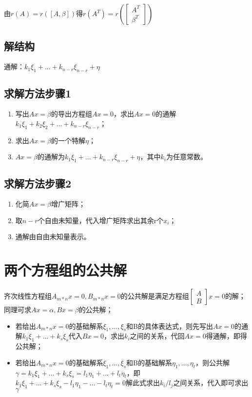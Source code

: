 由\(r(A) = r([A, \beta])\)得\(r(A^T) = r(\begin{bmatrix}
    A^T \\ 
    \beta^T
\end{bmatrix})\)

\subsection{解结构}
通解：\(k_1\xi_1 + ... + k_{n - r}\xi_{n - r} + \eta\)


\subsection{求解方法步骤1}
\begin{enumerate}
    \item 写出\(Ax = \beta\)的导出方程组\(Ax = 0\)，求出\(Ax = 0\)的通解\(k_1\xi_1 + k_2\xi_2 + ... + k_{n - r}\xi_{n - r}\)；
    \item 求出\(Ax = \beta\)的一个特解\(\eta\)；
    \item \(Ax = \beta\)的通解为\(k_1\xi_1 + ... + k_{n - r}\xi_{n - r} + \eta\)，其中\(k_i\)为任意常数。
\end{enumerate}


\subsection{求解方法步骤2}
\begin{enumerate}
    \item 化简\(Ax = \beta\)增广矩阵；
    \item 取\(n - r\)个自由未知量，代入增广矩阵求出其余r个\(x_i\)；
    \item 通解由自由未知量表示。
\end{enumerate}


\section{两个方程组的公共解}

齐次线性方程组\(A_{m * n}x = 0, B_{m * n}x = 0\)的公共解是满足方程组\(\begin{bmatrix}
A \\ 
B
\end{bmatrix}x = 0\)的解；同理可求\(Ax = \alpha, Bx = \beta\)的公共解；
\begin{itemize}
    \item 若给出\(A_{m * n}x = 0\)的基础解系\(\xi_1, ..., \xi_s\)和B的具体表达式，则先写出\(Ax = 0\)的通解\(k_1\xi_1 + ... + k_s\xi_s\)代入\(Bx = 0\)，求出\(k_i\)之间的关系，代回\(Ax = 0\)得通解，即得公共解；
    \item 若给出\(A_{m * n}x = 0\)的基础解系\(\xi_1, ..., \xi_s\)和B的基础解系\(\eta_1, ..., \eta_t\)，则公共解\(\gamma = k_1\xi_1 + ... + k_s\xi_s = l_1\eta_1 + ... + l_t\eta_t\)，即\(k_1\xi_1 + ... + k_s\xi_s - l_1\eta_1 - ... - l_t\eta_t = 0\)解此式求出\(k_i/l_j\)之间关系，代入即可求出\(\gamma\)
\end{itemize}


